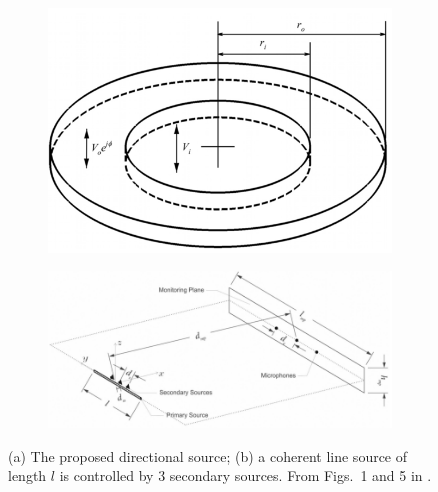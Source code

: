 \begin{figure}[!htb]
    \centering
    \begin{subfigure}{0.3\textwidth}
        \centering
        \includegraphics[width = \textwidth]{fig/hu2019jasa_secondary_source_resize.png}
        \caption{}
    \end{subfigure}
    \begin{subfigure}{0.69\textwidth}
        \centering
        \includegraphics[width = \textwidth]{fig/hu2019jasa_anc_system_resize.png}
        \caption{}
    \end{subfigure}
    \caption{(a) The proposed directional source; (b) a coherent line source of length $l$ is controlled by 3 secondary sources. From Figs.~1 and 5 in \cite{Hu2019ActiveCancellationSound}.}
    \label{fig:hu2019jasa}
\end{figure}

